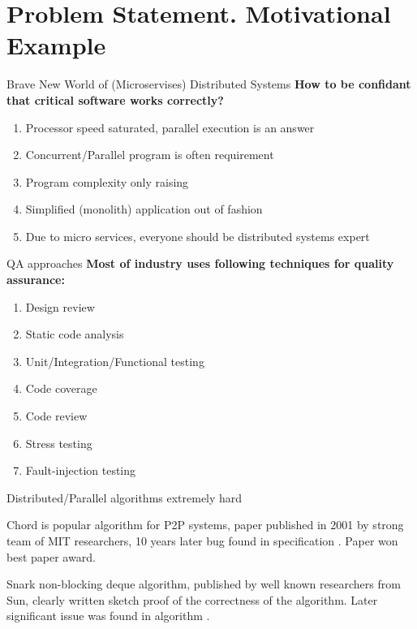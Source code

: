 \documentclass[12pt]{beamer}
\begin{document}
  \section{Problem Statement. Motivational Example}
  \begin{frame}{Brave New World of (Microservises) Distributed Systems}
      \textbf{How to be confidant that critical software works correctly?}
      \begin{enumerate}
          \item Processor speed saturated, parallel execution is an answer
          \item Concurrent/Parallel program is often requirement
          \item Program complexity only raising
          \item Simplified (monolith) application out of fashion
          \item Due to micro services, everyone should be distributed
              systems expert
      \end{enumerate}
  \end{frame}
  \begin{frame}{QA approaches}
      \textbf{Most of industry uses following techniques for quality
      assurance:}
      \begin{enumerate}
          \item Design review
          \item Static code analysis
          \item Unit/Integration/Functional testing
          \item Code coverage
          \item Code review
          \item Stress testing
          \item Fault-injection testing
      \end{enumerate}
  \end{frame}
  \begin{frame}{Distributed/Parallel algorithms extremely hard}
      \begin{alertblock}{Chord}
          is popular algorithm for P2P systems, paper published in
          2001 by strong team of MIT researchers, 10 years later bug found
          in specification \cite{stoica2001chord, Zave15}. Paper won best
          paper award.
      \end{alertblock}
      \begin{alertblock}{Snark}
          non-blocking deque algorithm, published by well known
          researchers from Sun, clearly written sketch proof of the correctness
          of the algorithm. Later significant issue was found in algorithm
          \cite{doherty2004dcas, lamport2006checking}.
      \end{alertblock}
  \end{frame}
\end{document}
